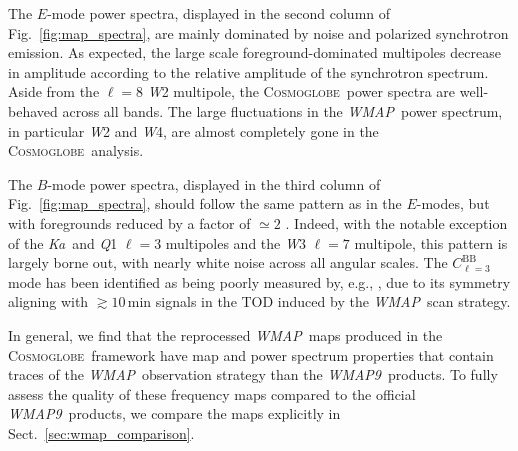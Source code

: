 \documentclass[twocolumn]{../../common/aa}
\def\WMAP{\emph{WMAP}}
\def\WMAPnine{\emph{WMAP9}}
\newcommand{\cosmoglobe}{\textsc{Cosmoglobe}}
\newcommand{\Ka}[0]{\textit{Ka}}
\newcommand{\Q}[0]{\textit Q}
\newcommand{\W}[0]{\textit W}
\begin{document}

The $E$-mode power spectra, displayed in the second column of Fig.~\ref{fig:map_spectra}, are mainly dominated by noise and polarized synchrotron emission. As expected, the large scale foreground-dominated multipoles decrease in amplitude according to the relative amplitude of the synchrotron spectrum. Aside from the $\ell=8$ \W2 multipole, the \cosmoglobe\ power spectra are well-behaved across all bands. The large fluctuations in the \WMAP\ power spectrum, in particular \W2 and \W4, are almost completely gone in the \cosmoglobe\ analysis.

The $B$-mode power spectra, displayed in the third column of Fig.~\ref{fig:map_spectra}, should follow the same pattern as in the $E$-modes, but with foregrounds reduced by a factor of $\simeq2$ \citep{bennett2012}. Indeed, with the notable exception of the \Ka\ and \Q1 $\ell=3$ multipoles and the \W3 $\ell=7$ multipole, this pattern is largely borne out, with nearly white noise across all angular scales. The $C_{\ell=3}^\mathrm{BB}$ mode has been identified as being poorly measured by, e.g., \citet{jarosik2010}, due to its symmetry aligning with $\gtrsim10\,\mathrm{min}$ signals in the TOD induced by the \WMAP\ scan strategy.

In general, we find that the reprocessed \WMAP\ maps produced in the \cosmoglobe\ framework have map and power spectrum properties that contain traces of the \WMAP\ observation strategy than the \WMAPnine\ products. To fully assess the quality of these frequency maps compared to the official \WMAPnine\ products, we compare the maps explicitly in Sect.~\ref{sec:wmap_comparison}.



\end{document}
